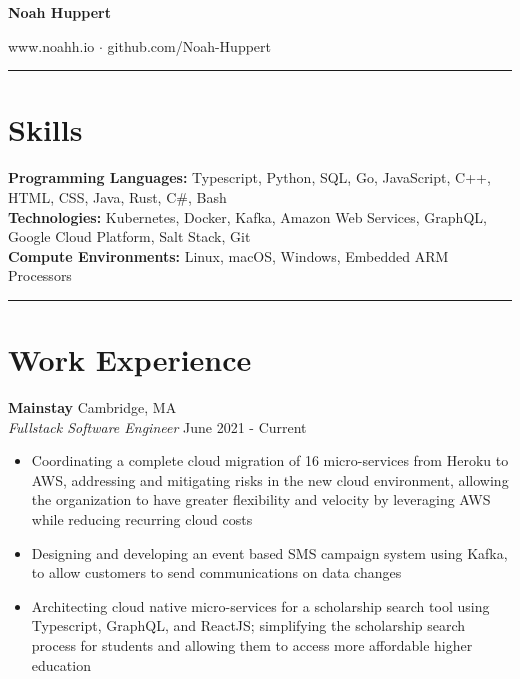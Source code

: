 \documentclass[10pt]{article}
\begin{document}

\centering
	{\huge\textbf{Noah Huppert}}
	\vspace{1ex}

	
	www.noahh.io $\cdot$ github.com/Noah-Huppert

	\rule{\columnwidth}{1pt}

\begin{flushleft}

\section{Skills}
    \textbf{Programming Languages:} Typescript, Python, SQL, Go, JavaScript, C++, HTML, CSS, Java, Rust, C\#, Bash \\ %
	\textbf{Technologies:} Kubernetes, Docker, Kafka, Amazon Web Services, GraphQL, Google Cloud Platform, Salt Stack, Git \\
	\textbf{Compute Environments:} Linux, macOS, Windows, Embedded ARM Processors

	\rule{\columnwidth}{0.4pt}

\section{Work Experience}
	\textbf{Mainstay} \hfill Cambridge, MA \\
	\textit{Fullstack Software Engineer} \hfill June 2021 - Current \\
    \begin{itemize}
		\item Coordinating a complete cloud migration of 16 micro-services from Heroku to AWS, addressing and mitigating risks in the new cloud environment, allowing the organization to have greater flexibility and velocity by leveraging AWS while reducing recurring cloud costs

		\item Designing and developing an event based SMS campaign system using Kafka, to allow customers to send communications on data changes

        \item Architecting cloud native micro-services for a scholarship search tool using Typescript, GraphQL, and ReactJS; simplifying the scholarship search process for students and allowing them to access more affordable higher education
	\end{itemize}


\end{flushleft}
\end{document}
